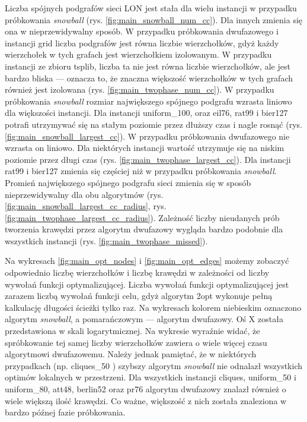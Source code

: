 Liczba spójnych podgrafów sieci LON jest stała dla wielu instancji w przypadku próbkowania \textit{snowball} (rys. \ref{fig:main_snowball_num_cc}). Dla innych zmienia się ona w nieprzewidywalny sposób.
W przypadku próbkowania dwufazowego i instancji grid liczba podgrafów jest równa liczbie wierzchołków, gdyż każdy wierzchołek w tych grafach jest wierzchołkiem izolowanym.
W przypadku instancji ze zbioru tsplib, liczba ta nie jest równa liczbie wierzchołków, ale jest bardzo bliska --- oznacza to, że znaczna większość
wierzchołków w tych grafach również jest izolowana (rys. \ref{fig:main_twophase_num_cc}).
W przypadku próbkowania \textit{snowball} rozmiar największego spójnego podgrafu wzrasta liniowo dla większości instancji. Dla instancji uniform\_100, oraz
eil76, rat99 i bier127 potrafi utrzymywać się na stałym poziomie przez dłuższy czas i nagle rosnąć (rys. \ref{fig:main_snowball_largest_cc}).
W przypadku próbkowania dwufazowego nie wzrasta on liniowo. Dla niektórych instancji wartość utrzymuje się na niskim poziomie przez długi czas (rys. \ref{fig:main_twophase_largest_cc}).
Dla instancji rat99 i bier127 zmienia się częściej niż w przypadku próbkowania \textit{snowball}.
Promień największego spójnego podgrafu sieci zmienia się w sposób nieprzewidywalny dla obu algorytmów (rys. \ref{fig:main_snowball_largest_cc_radius}, rys. \ref{fig:main_twophase_largest_cc_radius}).
Zależność liczby nieudanych prób tworzenia krawędzi przez algorytm dwufazowy wygląda bardzo podobnie dla wszystkich instancji (rys. \ref{fig:main_twophase_missed}).

Na wykresach \ref{fig:main_opt_nodes} i \ref{fig:main_opt_edges} możemy zobaczyć odpowiednio liczbę wierzchołków i liczbę krawędzi
w zależności od liczby wywołań funkcji optymalizującej. Liczba wywołań funkcji optymalizującej jest zarazem liczbą wywołań funkcji celu, gdyż
algorytm 2opt wykonuje pełną kalkulację długości ścieżki tylko raz.
Na wykresach kolorem niebieskim oznaczono algorytm \textit{snowball}, a pomarańczowym --- algorytm dwufazowy.
Oś X została przedstawiona w skali logarytmicznej.
Na wykresie wyraźnie widać, że spróbkowanie tej samej liczby wierzchołków zawiera o wiele więcej czasu algorytmowi dwufazowemu.
Należy jednak pamiętać, że w niektórych przypadkach (np. cliques\_50 ) szybszy algorytm \textit{snowball} nie odnalazł wszystkich optimów lokalnych w przestrzeni.
Dla wszystkich instancji cliques, uniform\_50 i uniform\_80, att48, berlin52 oraz pr76 algorytm dwufazowy znalazł również o wiele większą ilość krawędzi.
Co ważne, większość z nich została znaleziona w bardzo późnej fazie próbkowania.

